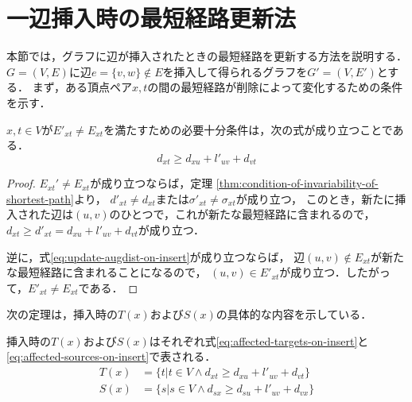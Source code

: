 \section{一辺挿入時の最短経路更新法}
\label{sect:update-apsp-on-insert}
本節では，グラフに辺が挿入されたときの最短経路を更新する方法を説明する．
$G=(V,E)$に辺$e=\{v,w\} \not\in E$を挿入して得られるグラフを$G'=(V,E')$とする．
まず，ある頂点ペア$x,t$の間の最短経路が削除によって変化するための条件を示す．

\begin{lemma}
  \label{lmm:update-augdist-on-insert}
  $x,t\in V$が$E'_{xt}\neq E_{xt}$を満たすための必要十分条件は，次の式が成り立つことである．
  \begin{equation}
    d_{xt}\geq d_{xu}+l'_{uv}+d_{vt}
    \label{eq:update-augdist-on-insert}
  \end{equation}
\end{lemma}
\begin{proof}
  $E_{xt}'\neq E_{xt}$が成り立つならば，定理
  \ref{thm:condition-of-invariability-of-shortest-path}より，
  $d'_{xt}\neq d_{xt}$または$\sigma'_{xt}\neq\sigma_{xt}$が成り立つ，
  このとき，新たに挿入された辺は$(u,v)$のひとつで，これが新たな最短経路に含まれるので，
  $d_{xt}\geq d'_{xt}=d_{xu}+l'_{uv}+d_{vt}$が成り立つ．

  逆に，式\eqref{eq:update-augdist-on-insert}が成り立つならば，
  辺$(u,v)\notin E_{xt}$が新たな最短経路に含まれることになるので，
  $(u,v)\in E'_{xt}$が成り立つ．したがって，$E'_{xt}\neq E_{xt}$である．
\end{proof}

次の定理は，挿入時の$T(x)$および$S(x)$の具体的な内容を示している．
\begin{theorem}
  \label{thm:affected-vertices-on-insert}
  挿入時の$T(x)$および$S(x)$はそれぞれ式\eqref{eq:affected-targets-on-insert}と
  \eqref{eq:affected-sources-on-insert}で表される．
  \begin{align}
    T(x)&=\{t|t\in V\land d_{xt}\geq d_{xu}+l'_{uv}+d_{vt}\}
    \label{eq:affected-targets-on-insert} \\
    S(x)&=\{s|s\in V\land d_{sx}\geq d_{su}+l'_{uv}+d_{vx}\}
    \label{eq:affected-sources-on-insert}
  \end{align}
\end{theorem}

